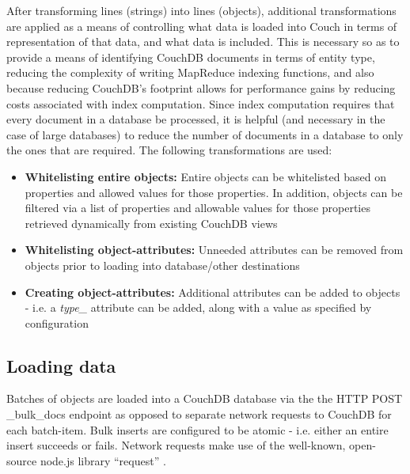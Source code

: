 After transforming lines (strings) into lines (objects), additional transformations are applied as a means of controlling what data is loaded into Couch in terms of representation of that data, and what data is included. This is necessary so as to provide a means of identifying CouchDB documents in terms of entity type, reducing the complexity of writing MapReduce indexing functions, and also because reducing CouchDB's footprint allows for performance gains by reducing costs associated with index computation. Since index computation requires that every document in a database be processed, it is helpful (and necessary in the case of large databases) to reduce the number of documents in a database to only the ones that are required. The following transformations are used:

\begin{itemize}
    \item \textbf{Whitelisting entire objects:} Entire objects can be whitelisted based on properties and allowed values for those properties. In addition, objects can be filtered via a list of properties and allowable values for those properties retrieved dynamically from existing CouchDB views
    \item \textbf{Whitelisting object-attributes:} Unneeded attributes can be removed from objects prior to loading into database/other destinations
    \item \textbf{Creating object-attributes:} Additional attributes can be added to objects - i.e. a \textit{type\_} attribute can be added, along with a value as specified by configuration
\end{itemize}

\subsection{Loading data}
Batches of objects are loaded into a CouchDB database via the the HTTP POST \_bulk\_docs endpoint as opposed to separate network requests to CouchDB for each batch-item. Bulk inserts are configured to be atomic - i.e. either an entire insert succeeds or fails. Network requests make use of the well-known, open-source node.js library ``request'' \cite{request-lib}.